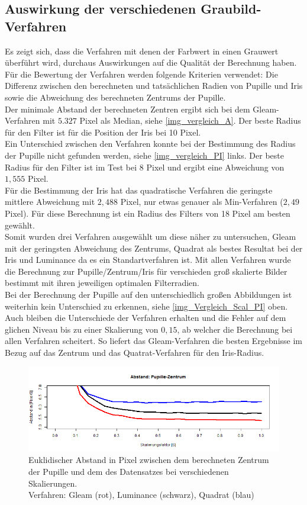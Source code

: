 \subsection{Auswirkung der verschiedenen Graubild-Verfahren}
\label{grau_Auswirkung_ElSe}
Es zeigt sich, dass die Verfahren mit denen der Farbwert in einen Grauwert überführt wird, durchaus Auswirkungen auf die Qualität der Berechnung haben.
\newpage
Für die Bewertung der Verfahren werden folgende Kriterien verwendet: Die Differenz zwischen den berechneten und tatsächlichen Radien von Pupille und Iris sowie die Abweichung des berechneten Zentrums der Pupille.\\
Der minimale Abstand der berechneten Zentren ergibt sich bei dem Gleam-Verfahren mit $5.327$ Pixel als Median, siehe \autoref{img_vergleich_A}. Der beste Radius für den Filter ist für die Position der Iris bei 10 Pixel.\\
Ein Unterschied zwischen den Verfahren konnte bei der Bestimmung des Radius der Pupille nicht gefunden werden, siehe \autoref{img_vergleich_PI} links. Der beste Radius für den Filter ist im Test bei 8 Pixel und ergibt eine Abweichung von $1,555$ Pixel.\\
Für die Bestimmung der Iris hat das quadratische Verfahren die geringste mittlere Abweichung mit $2,488$ Pixel, nur etwas genauer als Min-Verfahren ($2,49$ Pixel). Für diese Berechnung ist ein Radius des Filters von 18 Pixel am besten gewählt.\\
Somit wurden drei Verfahren ausgewählt um diese näher zu untersuchen, Gleam mit der geringsten Abweichung des Zentrums, Quadrat als bestes Resultat bei der Iris und Luminance da es ein Standartverfahren ist. Mit allen Verfahren wurde die Berechnung zur Pupille/Zentrum/Iris für verschieden groß skalierte Bilder bestimmt mit ihren jeweiligen optimalen Filterradien.\\
Bei der Berechnung der Pupille auf den unterschiedlich großen Abbildungen ist weiterhin kein Unterschied zu erkennen, siehe \autoref{img_Vergleich_Scal_PI} oben.\\
Auch bleiben die Unterschiede der Verfahren erhalten und die Fehler auf dem glichen Niveau bis zu einer Skalierung von $0,15$, ab welcher die Berechnung bei allen Verfahren scheitert. So liefert das Gleam-Verfahren die besten Ergebnisse im Bezug auf das Zentrum und das Quatrat-Verfahren für den Iris-Radius.
\begin{figure}
	\centering
	\includegraphics[width=\linewidth]{Eye_Img_Box/Vergleich_Scal_A}
	\caption{Euklidischer Abstand in Pixel zwischen dem berechneten Zentrum der Pupille und dem des Datensatzes bei verschiedenen Skalierungen.\\
		Verfahren: Gleam (rot), Luminance (schwarz),  Quadrat (blau)}
	\label{img_Vergleich_Scal_A}
\end{figure}
